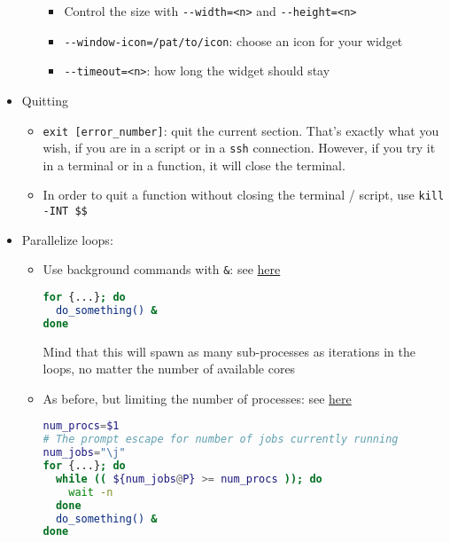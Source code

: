 \documentclass[a4paper,12pt,%
              final%
              ]{article}
\begin{document}
\begin{itemize}
\begin{itemize}
\begin{itemize}
          \item Control the size with \verb|--width=<n>| and \verb|--height=<n>|
          \item \verb|--window-icon=/pat/to/icon|: choose an icon for your widget
          \item \verb|--timeout=<n>|: how long the widget should stay
        \end{itemize}
    \end{itemize}
  \item Quitting
    \begin{itemize}
      \item \verb|exit [error_number]|: quit the current section. That's exactly what you wish, if you are in a script or in a \texttt{ssh} connection. However, if you try it in a terminal or in a function, it will close the terminal.
      \item In order to quit a function without closing the terminal / script, use \verb|kill -INT $$|
    \end{itemize}
  \item Parallelize loops:
    \begin{itemize}
      \item Use background commands with \verb|&|: see \href{https://unix.stackexchange.com/questions/103920/parallelize-a-bash-for-loop/103922}{here}
\begin{lstlisting}[language=bash]
for {...}; do
  do_something() &
done
\end{lstlisting}
        Mind that this will spawn as many sub-processes as iterations in the loops, no matter the number of available cores
      \item As before, but limiting the number of processes: see \href{https://stackoverflow.com/questions/38774355/how-to-parallelize-for-loop-in-bash-limiting-number-of-processes}{here}
\begin{lstlisting}[language=bash]
num_procs=$1
# The prompt escape for number of jobs currently running
num_jobs="\j"
for {...}; do
  while (( ${num_jobs@P} >= num_procs )); do
    wait -n
  done
  do_something() &
done
\end{lstlisting}
    \end{itemize}
\end{itemize}

\end{document}
